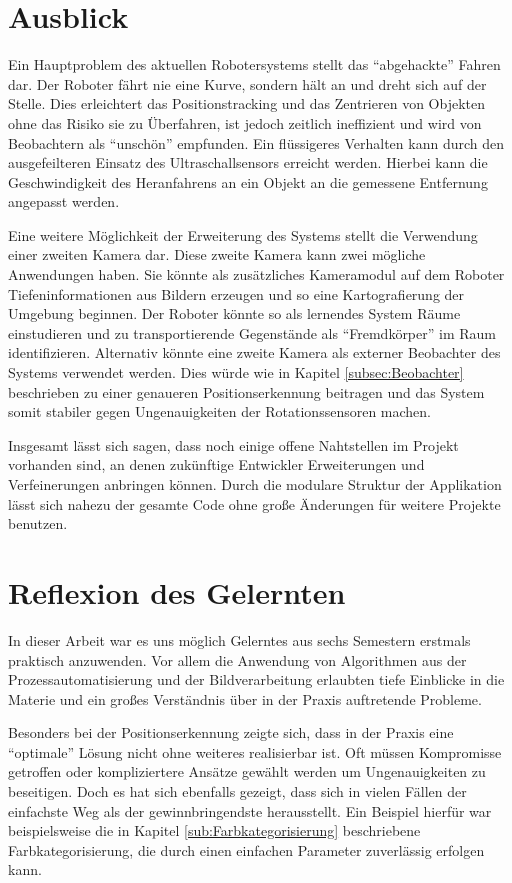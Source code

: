 \section{Ausblick}

Ein Hauptproblem des aktuellen Robotersystems stellt das \enquote{abgehackte} Fahren dar. Der Roboter fährt nie eine Kurve, sondern hält an und dreht sich auf der Stelle. Dies erleichtert das Positionstracking und das Zentrieren von Objekten ohne das Risiko sie zu Überfahren, ist jedoch zeitlich ineffizient und wird von Beobachtern als \enquote{unschön} empfunden. Ein flüssigeres Verhalten kann durch den ausgefeilteren Einsatz des Ultraschallsensors erreicht werden. Hierbei kann die Geschwindigkeit des Heranfahrens an ein Objekt an die gemessene Entfernung angepasst werden.

Eine weitere Möglichkeit der Erweiterung des Systems stellt die Verwendung einer zweiten Kamera dar. Diese zweite Kamera kann zwei mögliche Anwendungen haben. Sie könnte als zusätzliches Kameramodul auf dem Roboter Tiefeninformationen aus Bildern erzeugen und so eine Kartografierung der Umgebung beginnen. Der Roboter könnte so als lernendes System Räume einstudieren und zu transportierende Gegenstände als \enquote{Fremdkörper} im Raum identifizieren. Alternativ könnte eine zweite Kamera als externer Beobachter des Systems verwendet werden. Dies würde wie in Kapitel \ref{subsec:Beobachter} beschrieben zu einer genaueren Positionserkennung beitragen und das System somit stabiler gegen Ungenauigkeiten der Rotationssensoren machen.

Insgesamt lässt sich sagen, dass noch einige offene Nahtstellen im Projekt vorhanden sind, an denen zukünftige Entwickler Erweiterungen und Verfeinerungen anbringen können. Durch die modulare Struktur der Applikation lässt sich nahezu der gesamte Code ohne große Änderungen für weitere Projekte benutzen.

\section{Reflexion des Gelernten}

In dieser Arbeit war es uns möglich Gelerntes aus sechs Semestern erstmals praktisch anzuwenden. Vor allem die Anwendung von Algorithmen aus der Prozessautomatisierung und der Bildverarbeitung erlaubten tiefe Einblicke in die Materie und ein großes Verständnis über in der Praxis auftretende Probleme.

Besonders bei der Positionserkennung zeigte sich, dass in der Praxis eine \enquote{optimale} Lösung nicht ohne weiteres realisierbar ist. Oft müssen Kompromisse getroffen oder kompliziertere Ansätze gewählt werden um Ungenauigkeiten zu beseitigen. Doch es hat sich ebenfalls gezeigt, dass sich in vielen Fällen der einfachste Weg als der gewinnbringendste herausstellt. Ein Beispiel hierfür war beispielsweise die in Kapitel \ref{sub:Farbkategorisierung} beschriebene Farbkategorisierung, die durch einen einfachen Parameter zuverlässig erfolgen kann.

